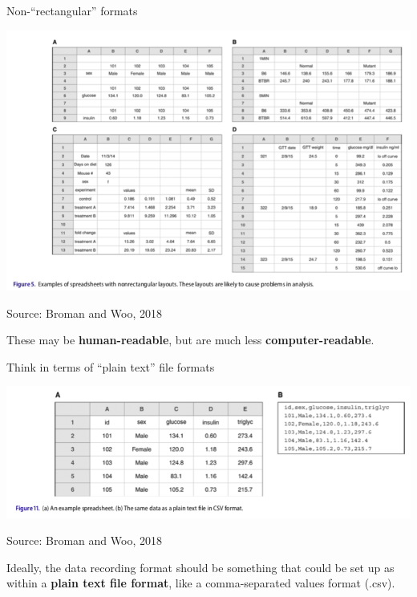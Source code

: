 \documentclass[ignorenonframetext,]{beamer}
\begin{document}
\begin{frame}{Non-``rectangular'' formats}
\protect\hypertarget{non-rectangular-formats}{}

\begin{center}\includegraphics[width=\textwidth]{figures/non_rectangular_data} \end{center}

\vspace{-0.4cm}

\scriptsize Source: Broman and Woo, 2018

\small These may be \textbf{human-readable}, but are much less
\textbf{computer-readable}.

\end{frame}

\begin{frame}{Think in terms of ``plain text'' file formats}
\protect\hypertarget{think-in-terms-of-plain-text-file-formats}{}

\begin{center}\includegraphics[width=\textwidth]{figures/plain_text_format} \end{center}

\vspace{-0.4cm}

\scriptsize Source: Broman and Woo, 2018

\medskip

\normalsize Ideally, the data recording format should be something that
could be set up as within a \textbf{plain text file format}, like a
comma-separated values format (.csv).

\end{frame}
\end{document}
